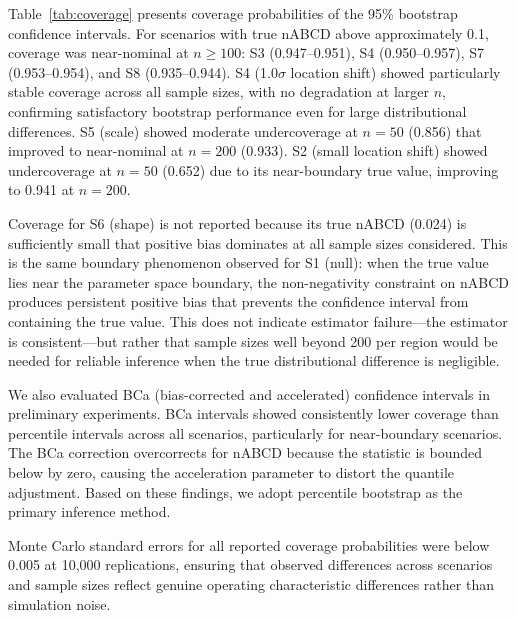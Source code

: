\documentclass[AMA,Times1COL]{WileyNJDv5}
\begin{document}
Table~\ref{tab:coverage} presents coverage probabilities of the 95\% bootstrap confidence intervals. For scenarios with true nABCD above approximately 0.1, coverage was near-nominal at $n \geq 100$: S3 (0.947--0.951), S4 (0.950--0.957), S7 (0.953--0.954), and S8 (0.935--0.944). S4 (1.0$\sigma$ location shift) showed particularly stable coverage across all sample sizes, with no degradation at larger $n$, confirming satisfactory bootstrap performance even for large distributional differences. S5 (scale) showed moderate undercoverage at $n=50$ (0.856) that improved to near-nominal at $n=200$ (0.933). S2 (small location shift) showed undercoverage at $n=50$ (0.652) due to its near-boundary true value, improving to 0.941 at $n=200$.

Coverage for S6 (shape) is not reported because its true nABCD (0.024) is sufficiently small that positive bias dominates at all sample sizes considered. This is the same boundary phenomenon observed for S1 (null): when the true value lies near the parameter space boundary, the non-negativity constraint on nABCD produces persistent positive bias that prevents the confidence interval from containing the true value. This does not indicate estimator failure---the estimator is consistent---but rather that sample sizes well beyond 200 per region would be needed for reliable inference when the true distributional difference is negligible.

We also evaluated BCa (bias-corrected and accelerated) confidence intervals in preliminary experiments. BCa intervals showed consistently lower coverage than percentile intervals across all scenarios, particularly for near-boundary scenarios. The BCa correction overcorrects for nABCD because the statistic is bounded below by zero, causing the acceleration parameter to distort the quantile adjustment. Based on these findings, we adopt percentile bootstrap as the primary inference method.

Monte Carlo standard errors for all reported coverage probabilities were below 0.005 at 10{,}000 replications, ensuring that observed differences across scenarios and sample sizes reflect genuine operating characteristic differences rather than simulation noise.
\end{document}
